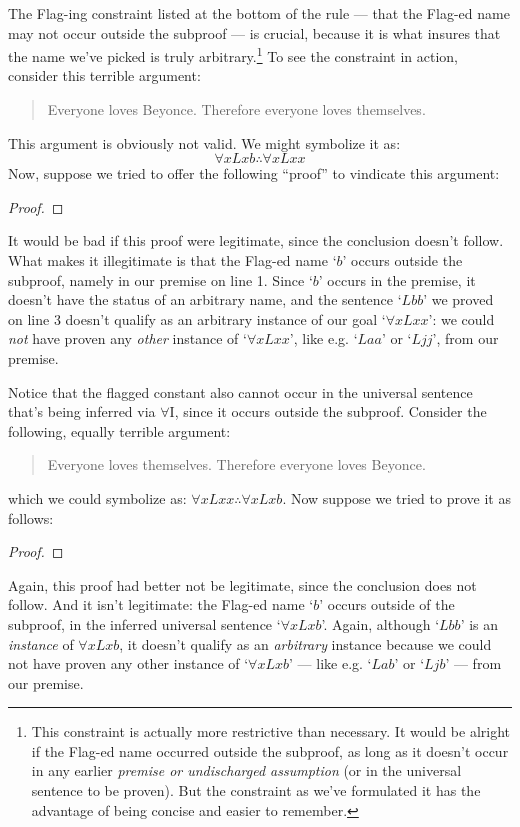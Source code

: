 The Flag-ing constraint listed at the bottom of the rule --- that the Flag-ed name may not occur outside the subproof --- is crucial, because it is what insures that the name we've picked is truly arbitrary.\footnote{This constraint is actually more restrictive than necessary.  It would be alright if the Flag-ed name occurred outside the subproof, as long as it doesn't occur in any earlier \emph{premise or undischarged assumption} (or in the universal sentence to be proven). But the constraint as we've formulated it has the advantage of being concise and easier to remember.}  To see the constraint in action, consider this terrible argument:
	\begin{quote}
		Everyone loves Beyonce.  Therefore everyone loves themselves.
	\end{quote}
This argument is obviously not valid.  We might symbolize it as:
$$\forall x Lxb \therefore \forall x Lxx$$
Now, suppose we tried to offer the following ``proof'' to vindicate this argument:
\begin{proof}
	 
	\open
	 \fl{}
	 
	\close
	 
\end{proof}\noindent
It would be bad if this proof were legitimate, since the conclusion doesn't follow.  What makes it illegitimate is that the Flag-ed name `$b$' occurs outside the subproof, namely in our premise on line 1. Since `$b$' occurs in the premise, it doesn't have the status of an arbitrary name, and the sentence `$Lbb$' we proved on line 3 doesn't qualify as an arbitrary instance of our goal `$\forall xLxx$': we could \emph{not} have proven any \emph{other} instance of `$\forall xLxx$', like e.g. `$Laa$' or `$Ljj$', from our premise.

Notice that the flagged constant also cannot occur in the universal sentence that's being inferred via $\forall$I, since it occurs outside the subproof.  Consider the following, equally terrible argument:

	\begin{quote}
		Everyone loves themselves.  Therefore everyone loves Beyonce.
\end{quote}
which we could symbolize as: $\forall xLxx \therefore \forall xLxb$.  Now suppose we tried to prove it as follows:
\begin{proof}
	 
	\open
	 \fl{}
	 
	\close
	 
\end{proof}\noindent
Again, this proof had better not be legitimate, since the conclusion does not follow.  And it isn't legitimate: the Flag-ed name `$b$' occurs outside of the subproof, in the inferred universal sentence `$\forall x Lxb$'.  Again, although `$Lbb$' is an \emph{instance} of $\forall xLxb$, it doesn't qualify as an \emph{arbitrary} instance because we could not have proven any other instance of `$\forall xLxb$' --- like e.g. `$Lab$' or `$Ljb$' --- from our premise.

